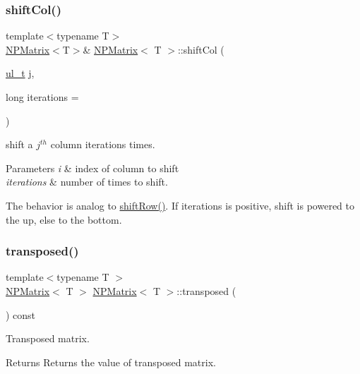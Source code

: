 \subsubsection{\texorpdfstring{shiftCol()}{shiftCol()}}
{\footnotesize\ttfamily template$<$typename T$>$ \\
\mbox{\hyperlink{class_n_p_matrix}{N\+P\+Matrix}}$<$T$>$\& \mbox{\hyperlink{class_n_p_matrix}{N\+P\+Matrix}}$<$ T $>$\+::shift\+Col (\begin{DoxyParamCaption}\item[{\mbox{\hyperlink{typedef_8h_a1b140a2034db3f5dfe18a987745df43a}{ul\+\_\+t}}}]{j,  }\item[{long}]{iterations = {} }\end{DoxyParamCaption})\hspace{0.3cm}{\ttfamily [inline]}}



shift a $ j^{th} $ column iterations times. 


\begin{DoxyParams}{Parameters}
{\em i} & index of column to shift \\
\hline
{\em iterations} & number of times to shift.\\
\hline
\end{DoxyParams}
The behavior is analog to {\ttfamily \mbox{\hyperlink{class_n_p_matrix_a8927e2dc64af30c6f619a93678332093}{shift\+Row()}}}. If {\ttfamily iterations} is positive, shift is powered to the up, else to the bottom. \mbox{\label{class_n_p_matrix_abb4f410d97dc7e89798c67112c1e1bd3}} 
\subsubsection{\texorpdfstring{transposed()}{transposed()}}
{\footnotesize\ttfamily template$<$typename T $>$ \\
\mbox{\hyperlink{class_n_p_matrix}{N\+P\+Matrix}}$<$ T $>$ \mbox{\hyperlink{class_n_p_matrix}{N\+P\+Matrix}}$<$ T $>$\+::transposed (\begin{DoxyParamCaption}{ }\end{DoxyParamCaption}) const}



Transposed matrix. 

\begin{DoxyReturn}{Returns}
Returns the value of transposed matrix. 
\end{DoxyReturn}
\mbox{\label{class_n_p_matrix_a007a87743223b6dddaa3ec8e44489ffb}} 
